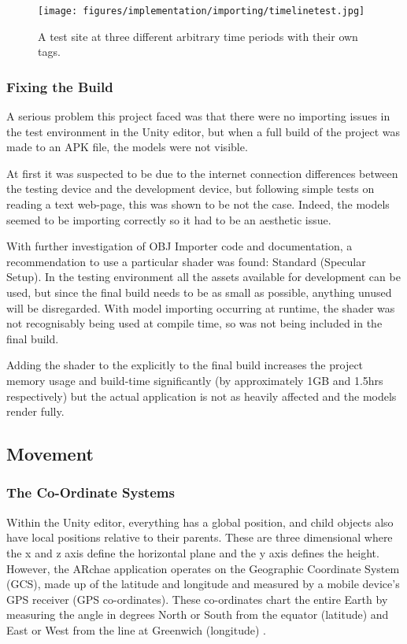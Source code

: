 \documentclass[12pt, a4paper]{article}
\begin{document}
\begin{figure}[h]
    \centering
    \texttt{[image: figures/implementation/importing/timelinetest.jpg]}
        \caption{A test site at three different arbitrary time periods with their own tags.}
        \label{fig:timelinetest}
\end{figure}

\subsubsection{Fixing the Build}
A serious problem this project faced was that there were no importing issues in the test environment in the Unity editor, but when a full build of the project was made to an APK file, the models were not visible. 

At first it was suspected to be due to the internet connection differences between the testing device and the development device, but following simple tests on reading a text web-page, this was shown to be not the case. Indeed, the models seemed to be importing correctly so it had to be an aesthetic issue. 

With further investigation of OBJ Importer code and documentation, a recommendation to use a particular shader was found: Standard (Specular Setup). In the testing environment all the assets available for development can be used, but since the final build needs to be as small as possible, anything unused will be disregarded. With model importing occurring at runtime, the shader was not recognisably being used at compile time, so was not being included in the final build.

Adding the shader to the explicitly to the final build increases the project memory usage and build-time significantly (by approximately 1GB and 1.5hrs respectively) but the actual application is not as heavily affected and the models render fully.

\subsection{Movement}
\label{movement}

\subsubsection{The Co-Ordinate Systems}
Within the Unity editor, everything has a global position, and child objects also have local positions relative to their parents. These are three dimensional where the x and z axis define the horizontal plane and the y axis defines the height. However, the ARchae application operates on the Geographic Coordinate System (GCS), made up of the latitude and longitude and measured by a mobile device's GPS receiver (GPS co-ordinates). These co-ordinates chart the entire Earth by measuring the angle in degrees North or South from the equator (latitude) and East or West from the line at Greenwich (longitude) \cite{movement:latitudelongitude}.
\end{document}
